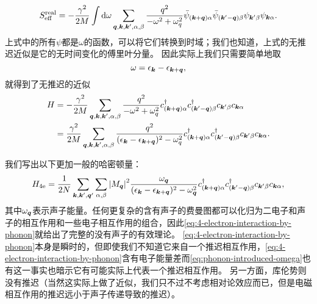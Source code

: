 \documentclass[hyperref, UTF8, a4paper]{ctexart}
\begin{document}
\[
    S_\text{eff}^\text{real} = - \frac{\gamma^2}{2 M} \int \dd{\omega} \sum_{\vb*{q}, \vb*{k}, \vb*{k}', \alpha, \beta} \frac{q^2}{- \omega^2 + \omega_q^2} \bar{\psi}_{(\vb*{k}+\vb*{q}) \alpha} \bar{\psi}_{(\vb*{k}' - \vb*{q}) \beta} \psi_{\vb*{k}' \beta} \psi_{\vb*{k} \alpha}.
\]
上式中的所有$\psi$都是$\omega$的函数，可以将它们转换到时域；我们也知道，上式的无推迟近似是它的无时间变化的傅里叶分量。
因此实际上我们只需要简单地取
\begin{equation}
    \omega = \epsilon_{\vb*{k}} - \epsilon_{\vb*{k} + \vb*{q}},
    \label{eq:phonon-introduced-omega}
\end{equation}
就得到了无推迟的近似
\begin{equation}
    \begin{aligned}
        {H} &= - \frac{\gamma^2}{2 M} \sum_{\vb*{q}, \vb*{k}, \vb*{k}', \alpha, \beta} \frac{q^2}{- \omega^2 + \omega_q^2} {c}^\dagger_{(\vb*{k}+\vb*{q}) \alpha} {c}^\dagger_{(\vb*{k}' - \vb*{q}) \beta} {c}_{\vb*{k}' \beta} {c}_{\vb*{k} \alpha} \\
        &= \frac{\gamma^2}{2 M} \sum_{\vb*{q}, \vb*{k}, \vb*{k}', \alpha, \beta} \frac{q^2}{(\epsilon_{\vb*{k}} - \epsilon_{\vb*{k}+\vb*{q}})^2 - \omega_q^2} {c}^\dagger_{(\vb*{k}+\vb*{q}) \alpha} {c}^\dagger_{(\vb*{k}' - \vb*{q}) \beta} {c}_{\vb*{k}' \beta} {c}_{\vb*{k} \alpha}.
    \end{aligned}
\end{equation}

我们写出以下更加一般的哈密顿量：
\begin{equation}
    {H}_{4\text{e}} = \frac{1}{2N} \sum_{\vb*{k}, \vb*{k}', \vb*{q}'} \sum_{\alpha, \beta} \abs{M_{\vb*{q}}}^2 \frac{\omega_{\vb*{q}}}{(\epsilon_{\vb*{k}} - \epsilon_{\vb*{k}+\vb*{q}})^2 - \omega_{\vb*{q}}^2} {c}^\dagger_{(\vb*{k}+\vb*{q}) \alpha} {c}^\dagger_{(\vb*{k}'-\vb*{q}) \beta} {c}_{\vb*{k}' \beta} {c}_{\vb*{k} \alpha},
    \label{eq:4-electron-interaction-by-phonon}
\end{equation}
其中$\omega_{\vb*{q}}$表示声子能量。任何更复杂的含有声子的费曼图都可以化归为二电子和声子的相互作用和一些电子相互作用的组合，因此\eqref{eq:4-electron-interaction-by-phonon}就给出了完整的没有声子的有效理论。
\eqref{eq:4-electron-interaction-by-phonon}本身是瞬时的，但即使我们不知道它来自一个推迟相互作用，\eqref{eq:4-electron-interaction-by-phonon}含有电子能量差而\eqref{eq:phonon-introduced-omega}也有这一事实也暗示它有可能实际上代表一个推迟相互作用。
另一方面，库伦势则没有推迟（当然这实际上做了近似，我们只不过不考虑相对论效应而已，但是电磁相互作用的推迟远小于声子传递导致的推迟）。
\end{document}
